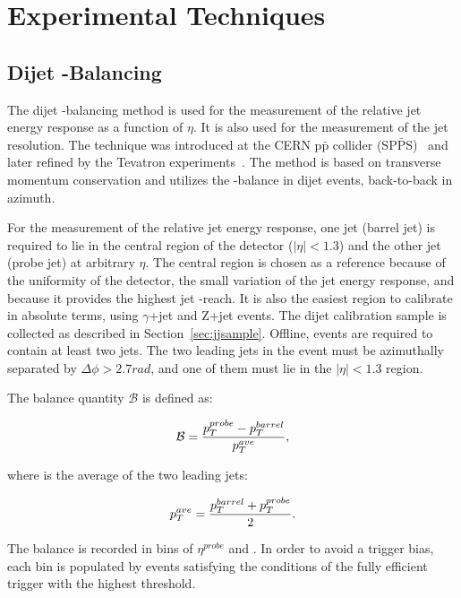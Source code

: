 \section{Experimental Techniques}\label{sec:methods}


\subsection{Dijet \pt-Balancing}

The dijet \pt-balancing method is used for the measurement of the relative jet energy response as a function of $\eta$. It is also used for the measurement of the jet \pt resolution. The technique was introduced at the CERN p$\bar{\text{p}}$ collider (SP$\bar{\text{P}}$S)~\cite{spps} and later refined by the Tevatron experiments~\cite{jes_d0, jes_cdf}. The method is based on transverse momentum conservation and utilizes the \pt-balance in dijet events, back-to-back in azimuth. 

For the measurement of the relative jet energy response, one jet (barrel jet) is required to lie in the central region of the detector ($|\eta|<1.3$) and the other jet (probe jet) at arbitrary $\eta$. The central region is chosen as a reference because of the uniformity of the detector, the small variation of the jet energy response, and because it provides the highest jet \pt-reach. It is also the easiest region to calibrate in absolute terms, using $\gamma$+jet and Z+jet events. The dijet calibration sample is collected as described in Section~\ref{sec:jjsample}. Offline, events are required to contain at least two jets. The two leading jets in the event must be  azimuthally separated  by $\Delta \phi > 2.7 rad$, and one of them must lie in the $|\eta|<1.3$ region.  

The balance quantity $\mathcal{B}$ is defined as:

\begin{equation}
\mathcal{B}=\frac{p_{{T}}^{probe}-p_{{T}}^{barrel}}{p_{{T}}^{{ave}}},
\end{equation}

where \ptave is the average \pt of the two leading jets:

\begin{equation}
  p_{{T}}^{{ave}} = \frac{p_{{T}}^{barrel}+p_{{T}}^{probe}}{2}.
\end{equation}

The balance is recorded in bins of $\eta^{probe}$ and \ptave. In order to avoid a trigger bias, each \ptave bin is populated by events satisfying the conditions of the fully efficient trigger with the highest threshold.


